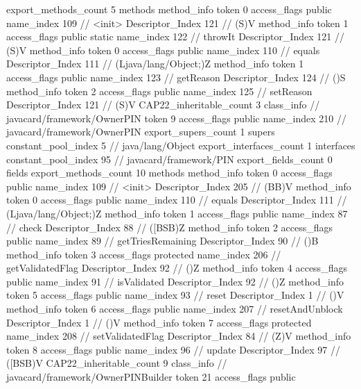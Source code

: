 {{{{			}
			export_methods_count	5
			methods {
				method_info {
					token	0
					access_flags	public
					name_index	109		// <init>
					Descriptor_Index	121		// (S)V
				}
				method_info {
					token	1
					access_flags	public static
					name_index	122		// throwIt
					Descriptor_Index	121		// (S)V
				}
				method_info {
					token	0
					access_flags	public
					name_index	110		// equals
					Descriptor_Index	111		// (Ljava/lang/Object;)Z
				}
				method_info {
					token	1
					access_flags	public
					name_index	123		// getReason
					Descriptor_Index	124		// ()S
				}
				method_info {
					token	2
					access_flags	public
					name_index	125		// setReason
					Descriptor_Index	121		// (S)V
				}
			}
			CAP22_inheritable_count	3
		}
		class_info {		// javacard/framework/OwnerPIN
			token	9
			access_flags	public
			name_index	210		// javacard/framework/OwnerPIN
			export_supers_count	1
			supers {
				constant_pool_index	5		// java/lang/Object
			}
			export_interfaces_count	1
			interfaces {
				constant_pool_index	95		// javacard/framework/PIN
			}
			export_fields_count	0
			fields {
			}
			export_methods_count	10
			methods {
				method_info {
					token	0
					access_flags	public
					name_index	109		// <init>
					Descriptor_Index	205		// (BB)V
				}
				method_info {
					token	0
					access_flags	public
					name_index	110		// equals
					Descriptor_Index	111		// (Ljava/lang/Object;)Z
				}
				method_info {
					token	1
					access_flags	public
					name_index	87		// check
					Descriptor_Index	88		// ([BSB)Z
				}
				method_info {
					token	2
					access_flags	public
					name_index	89		// getTriesRemaining
					Descriptor_Index	90		// ()B
				}
				method_info {
					token	3
					access_flags	protected
					name_index	206		// getValidatedFlag
					Descriptor_Index	92		// ()Z
				}
				method_info {
					token	4
					access_flags	public
					name_index	91		// isValidated
					Descriptor_Index	92		// ()Z
				}
				method_info {
					token	5
					access_flags	public
					name_index	93		// reset
					Descriptor_Index	1		// ()V
				}
				method_info {
					token	6
					access_flags	public
					name_index	207		// resetAndUnblock
					Descriptor_Index	1		// ()V
				}
				method_info {
					token	7
					access_flags	protected
					name_index	208		// setValidatedFlag
					Descriptor_Index	84		// (Z)V
				}
				method_info {
					token	8
					access_flags	public
					name_index	96		// update
					Descriptor_Index	97		// ([BSB)V
				}
			}
			CAP22_inheritable_count	9
		}
		class_info {		// javacard/framework/OwnerPINBuilder
			token	21
			access_flags	public
}}}

